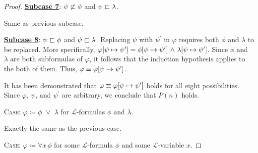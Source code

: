 \begin{proof}
    \vspace{0.3cm}
    \noindent
    \underline{\textbf{Subcase 7}}: \( \psi  \not\sqsubset  \phi \) and \( \psi  \sqsubset  \lambda \).
    
    \vspace{0.1cm}
    \noindent
    Same as previous subcase.

    \vspace{0.3cm}
    \noindent
    \underline{\textbf{Subcase 8}}: \( \psi  \sqsubset  \phi \) and \( \psi  \sqsubset  \lambda \).
    Replacing \( \psi \) with \( \psi^{\prime} \) in \( \varphi \) requires both \( \phi \) and \( \lambda \) to be replaced.
    More specifically, \( \folsubformulasubstitution{\varphi}{\psi}{\psi^{\prime}} =
    \folsubformulasubstitution{\phi}{\psi}{\psi^{\prime}} \,\,{\land}\,\,
    \folsubformulasubstitution{\lambda}{\psi}{\psi^{\prime}} \).
    Since \( \phi \) and \( \lambda \) are both subformulas of \( \varphi \), it follows that the induction hypothesis applies
    to the both of them.
    Thus, \( \varphi \equiv \folsubformulasubstitution{\varphi}{\psi}{\psi^{\prime}} \).

    \vspace{0.3cm}
    \noindent
    It has been demonstrated that \( \varphi \equiv \folsubformulasubstitution{\varphi}{\psi}{\psi^{\prime}} \) holds for all eight possibilities.
    Since \( \varphi \), \( \psi \), and \( \psi^{\prime} \) are arbitrary, we conclude that \( P(n) \) holds.

    \vspace{0.3cm}
    \noindent
    {\scshape Case:} \( \varphi \coloneq \phi \,\,{\lor}\,\, \lambda \) for \( \mathcal{L} \)-formulas \( \phi \) and \( \lambda \).

    \vspace{0.1cm}
    \noindent
    Exactly the same as the previous case.

    \vspace{0.3cm}
    \noindent
    {\scshape Case:} \( \varphi \coloneq \forall x \, \phi \) for some \( \mathcal{L} \)-formula \( \phi \) and some \( \mathcal{L} \)-variable \( x \).


\end{proof}
